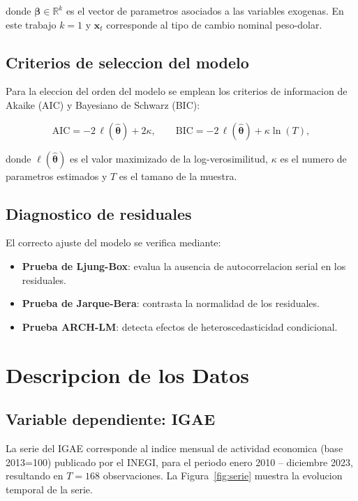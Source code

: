 \documentclass[12pt,a4paper]{article}
\begin{document}
donde $\boldsymbol{\beta} \in \mathbb{R}^k$ es el vector de parametros asociados a las variables exogenas. En este trabajo $k=1$ y $\mathbf{x}_t$ corresponde al tipo de cambio nominal peso-dolar.

\subsection{Criterios de seleccion del modelo}

Para la eleccion del orden del modelo se emplean los criterios de informacion de Akaike (AIC) y Bayesiano de Schwarz (BIC):

\begin{equation}
  \text{AIC} = -2\,\ell(\hat{\boldsymbol{\theta}}) + 2\kappa, \qquad
  \text{BIC} = -2\,\ell(\hat{\boldsymbol{\theta}}) + \kappa\ln(T),
  \label{eq:criterios}
\end{equation}

donde $\ell(\hat{\boldsymbol{\theta}})$ es el valor maximizado de la log-verosimilitud, $\kappa$ es el numero de parametros estimados y $T$ es el tamano de la muestra.

\subsection{Diagnostico de residuales}

El correcto ajuste del modelo se verifica mediante:
\begin{itemize}
  \item \textbf{Prueba de Ljung-Box}: evalua la ausencia de autocorrelacion serial en los residuales.
  \item \textbf{Prueba de Jarque-Bera}: contrasta la normalidad de los residuales.
  \item \textbf{Prueba ARCH-LM}: detecta efectos de heteroscedasticidad condicional.
\end{itemize}

\section{Descripcion de los Datos}

\subsection{Variable dependiente: IGAE}

La serie del IGAE corresponde al indice mensual de actividad economica (base 2013=100) publicado por el INEGI, para el periodo enero 2010 -- diciembre 2023, resultando en $T = 168$ observaciones. La Figura~\ref{fig:serie} muestra la evolucion temporal de la serie.
\end{document}
